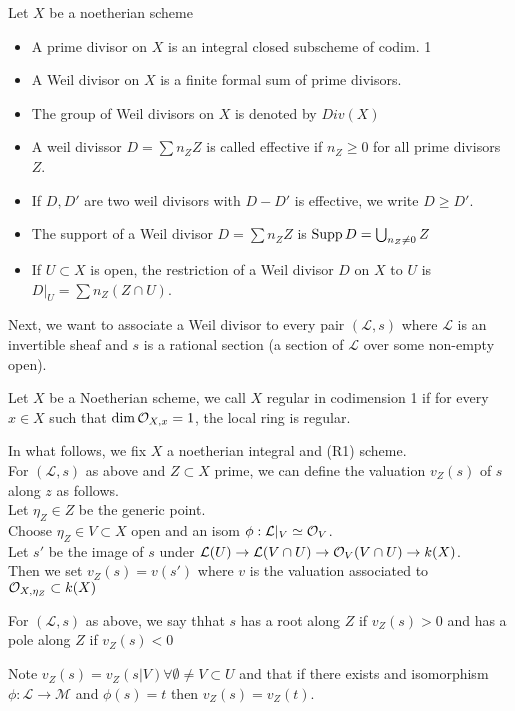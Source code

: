 \documentclass[../main.tex]{subfiles}
\begin{document}
\begin{defn}[Divisor]
	Let $X$ be a noetherian scheme
	\begin{itemize}
	\item A prime divisor on $X$ is an integral closed subscheme of codim. 1 
	\item A Weil divisor on $X$ is a finite formal sum of prime divisors.
	\item The group of Weil divisors on $X$ is denoted by $Div( X) $ 
	\item A weil divissor $D= \sum n_Z Z$ is called effective if $n_Z \geq 0$ for all prime divisors $Z$.
	\item If $D,D'$ are two weil divisors with $D-D'$ is effective, we write $D \geq D'$.
	\item The support of a Weil divisor $D= \sum n_Z Z$ is $\operatorname{Supp} D = \bigcup_{n_Z \neq 0} Z$ 
	\item If $U \subset X$ is open, the restriction of a Weil divisor $D$ on $X$ to $U$ is $D|_U = \sum n_Z ( Z\cap U) $.
	\end{itemize}
\end{defn}
Next, we want to associate a Weil divisor to every pair $(  \mathcal{L}, s) $ where $ \mathcal{L}$ is an invertible sheaf and $s$ is a rational section (a section of $ \mathcal{L}$ over some non-empty open).
\begin{defn}
	Let $X$ be a Noetherian scheme, we call $X$ regular in codimension 1 if for every $x\in X$ such that $\dim \mathcal{O}_{X,x} =1$, the local ring is regular.
\end{defn}
In what follows, we fix $X$ a noetherian integral and (R1) scheme.\\
For $ ( \mathcal{L},s )$ as above and $Z \subset X$ prime, we can define the valuation $v_Z ( s) $ of $s$ along $z$ as follows.\\
Let $\eta_Z \in Z$ be the generic point.\\
Choose $\eta_Z \in V \subset X$ open and an isom $\phi: \mathcal{L}|_V \simeq \mathcal{O}_V$.\\
Let $s'$ be the image of $s$ under $ \mathcal{L}( U) \to \mathcal{L}( V\cap U) \to \mathcal{O}_V( V\cap U) \to k(X) $.\\
Then we set $v_Z( s) = v( s') $ where $v$ is the valuation associated to $\mathcal{O}_{X, \eta_Z} \subset k( X) $
\begin{defn}
	For $ ( \mathcal{L},s) $ as above, we say thhat $s$ has a root along $Z$ if $v_Z( s) >0$ and has a pole along $Z$ if $v_Z( s) <0$ 
\end{defn}
Note $v_Z( s) = v_Z( s|V) \forall \emptyset \neq V \subset U$ and that if there exists and isomorphism $ \phi: \mathcal{L}\to \mathcal{M}$ and $\phi( s) =t$ then $v_Z( s) = v_Z( t) $.\\
\end{document}
